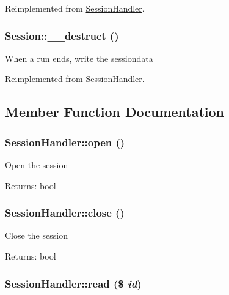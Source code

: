 Reimplemented from \hyperlink{classSessionHandler_546ba6d31a1ce532de13f65aadc3be0e}{SessionHandler}.\hypertarget{classSession_a498272c85524e4700abc3363883165b}{
\subsubsection{\setlength{\rightskip}{0pt plus 5cm}Session::\_\-\_\-destruct ()}}
\label{classSession_a498272c85524e4700abc3363883165b}


When a run ends, write the sessiondata 

Reimplemented from \hyperlink{classSessionHandler_461097c3ee6b1aecf833ce1225d02329}{SessionHandler}.

\subsection{Member Function Documentation}
\hypertarget{classSessionHandler_50aa0b123f53d99de350a0eb02b4bfa5}{
\subsubsection{\setlength{\rightskip}{0pt plus 5cm}SessionHandler::open ()}}
\label{classSessionHandler_50aa0b123f53d99de350a0eb02b4bfa5}


Open the session

\begin{Desc}
\item[Returns:]bool \end{Desc}
\hypertarget{classSessionHandler_335ced83731c7e3e685b7e0df2989c79}{
\subsubsection{\setlength{\rightskip}{0pt plus 5cm}SessionHandler::close ()}}
\label{classSessionHandler_335ced83731c7e3e685b7e0df2989c79}


Close the session

\begin{Desc}
\item[Returns:]bool \end{Desc}
\hypertarget{classSessionHandler_58cc3e5bf5b14e7bfbc73162de1f5d2b}{
\subsubsection{\setlength{\rightskip}{0pt plus 5cm}SessionHandler::read (\$ {\em id})}}
\label{classSessionHandler_58cc3e5bf5b14e7bfbc73162de1f5d2b}


